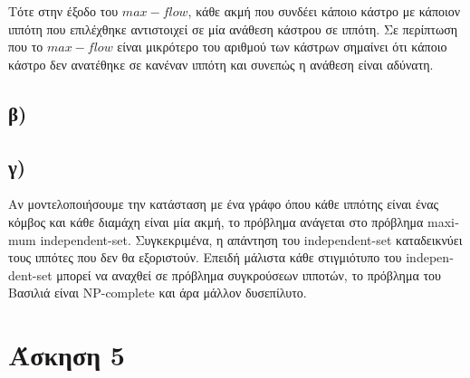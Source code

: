 \documentclass[11pt,a4paper,oneside]{report}
\begin{document}
Τότε στην έξοδο του $max-flow$, κάθε ακμή που συνδέει κάποιο κάστρο με κάποιον ιππότη που επιλέχθηκε αντιστοιχεί σε μία ανάθεση κάστρου σε ιππότη. Σε περίπτωση που το $max-flow$ είναι μικρότερο του αριθμού των κάστρων σημαίνει ότι κάποιο κάστρο δεν ανατέθηκε σε κανέναν ιππότη και συνεπώς η ανάθεση είναι αδύνατη.

\subsection*{β)}
\subsection*{γ)} Αν μοντελοποιήσουμε την κατάσταση με ένα γράφο όπου κάθε ιππότης είναι ένας κόμβος και κάθε διαμάχη είναι μία ακμή, το πρόβλημα ανάγεται στο πρόβλημα \textlatin{maximum independent-set}. Συγκεκριμένα, η απάντηση του \textlatin{independent-set} καταδεικνύει τους ιππότες που δεν θα εξοριστούν. Επειδή μάλιστα κάθε στιγμιότυπο του \textlatin{independent-set} μπορεί να αναχθεί σε πρόβλημα συγκρούσεων ιπποτών, το πρόβλημα του Βασιλιά είναι \textlatin{NP-complete} και άρα μάλλον δυσεπίλυτο.

\section*{Άσκηση 5}
\end{document}
